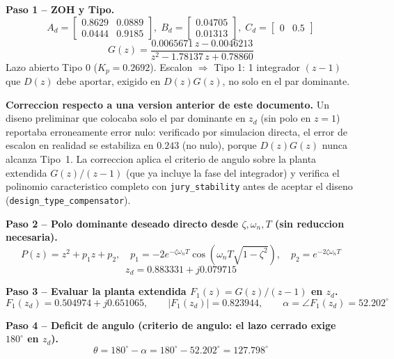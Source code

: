 \documentclass[11pt]{article}
\begin{document}
\textbf{Paso 1 -- ZOH y Tipo.}
\begin{equation}
A_d=\begin{bmatrix}0.8629&0.0889\\0.0444&0.9185\end{bmatrix},\;
B_d=\begin{bmatrix}0.04705\\0.01313\end{bmatrix},\;
C_d=\begin{bmatrix}0&0.5\end{bmatrix}
\end{equation}
\begin{equation}
G(z)=\frac{0.0065671\,z-0.0046213}{z^2-1.78137\,z+0.78860}
\end{equation}
Lazo abierto Tipo 0 ($K_p=0.2692$). Escalon $\Rightarrow$ Tipo 1: 1 integrador $(z-1)$
que $D(z)$ debe aportar, exigido en $D(z)G(z)$, no solo en el par dominante.

\begin{findingbox}
\textbf{Correccion respecto a una version anterior de este documento.} Un
diseno preliminar que colocaba solo el par dominante en $z_d$ (sin polo en
$z=1$) reportaba erroneamente error nulo: verificado por simulacion directa,
el error de escalon en realidad se estabiliza en $0.243$ (no nulo), porque
$D(z)G(z)$ nunca alcanza Tipo~1. La correccion aplica el criterio de angulo
sobre la planta extendida $G(z)/(z-1)$ (que ya incluye la fase del
integrador) y verifica el polinomio caracteristico completo con
\texttt{jury\_stability} antes de aceptar el diseno
(\texttt{design\_type\_compensator}).
\end{findingbox}

\textbf{Paso 2 -- Polo dominante deseado directo desde $\zeta,\omega_n,T$ (sin reduccion necesaria).}
\begin{equation}
P(z)=z^2+p_1z+p_2,\quad p_1=-2e^{-\zeta\omega_nT}\cos(\omega_nT\sqrt{1-\zeta^2}),\quad
p_2=e^{-2\zeta\omega_nT}
\end{equation}
\begin{equation}
z_d=0.883331+j0.079715
\end{equation}

\textbf{Paso 3 -- Evaluar la planta extendida $F_1(z)=G(z)/(z-1)$ en $z_d$.}
\begin{equation}
F_1(z_d)=0.504974+j0.651065,\qquad
|F_1(z_d)|=0.823944,\qquad \alpha=\angle F_1(z_d)=52.202^\circ
\end{equation}

\textbf{Paso 4 -- Deficit de angulo (criterio de angulo: el lazo cerrado exige $180^\circ$ en $z_d$).}
\begin{equation}
\theta=180^\circ-\alpha=180^\circ-52.202^\circ=127.798^\circ
\end{equation}
\end{document}
